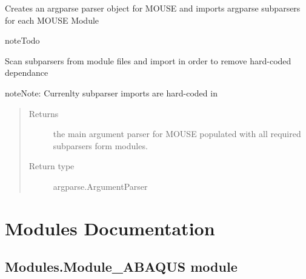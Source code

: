 \documentclass[letterpaper,10pt,english]{sphinxmanual}
\begin{document}
\begin{fulllineitems}
\label{\detokenize{MouseReferenceManual:MOUSE.createParser}}
Creates an argparse parser object for MOUSE and imports argparse subparsers for each MOUSE Module

\begin{sphinxadmonition}{note}{Todo}

Scan subparsers from module files and import in order to remove hard-coded dependance
\end{sphinxadmonition}

\begin{sphinxadmonition}{note}{Note:}
Currenlty subparser imports are hard-coded in
\end{sphinxadmonition}
\begin{quote}\begin{description}
\item[{Returns}] \leavevmode
the main argument parser for MOUSE populated with all required subparsers form modules.

\item[{Return type}] \leavevmode
argparse.ArgumentParser

\end{description}\end{quote}

\end{fulllineitems}



\section{Modules Documentation}
\label{\detokenize{MouseReferenceManual:modules-documentation}}

\subsection{Modules.Module\_ABAQUS module}
\label{\detokenize{MouseReferenceManual:module-Modules.Module_ABAQUS}}\label{\detokenize{MouseReferenceManual:modules-module-abaqus-module}}
\end{document}

